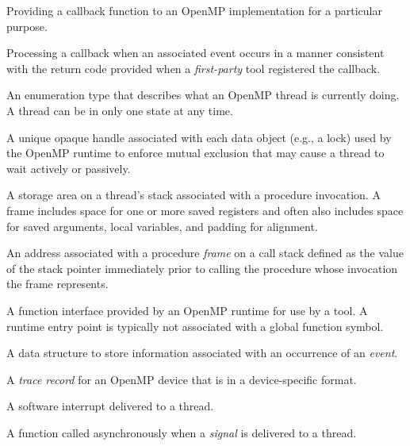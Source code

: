 \glossarydefstart
Providing a callback function to an OpenMP implementation for a particular purpose.
\glossarydefend

\glossarydefstart
Processing a callback when an associated event occurs in a manner consistent with the return code
provided when a \emph{first-party} tool registered the callback.
\glossarydefend

\glossarydefstart
An enumeration type that describes what an OpenMP thread is currently doing.  
A thread can be in only one state at any time.
\glossarydefend

\glossarydefstart
A unique opaque handle associated with each data object (e.g., a lock) used by the OpenMP runtime
to enforce mutual exclusion that may cause a thread to wait actively or passively.
\glossarydefend

\glossarydefstart
A storage area on a thread's stack associated with a procedure invocation. A frame includes space for 
one or more saved registers and often also includes space for saved arguments, local variables, 
and padding for alignment.
\glossarydefend

\glossarydefstart
An address associated with a procedure \emph{frame} on a call stack defined as the value of the stack pointer immediately prior 
to calling the procedure whose invocation the frame represents.
\glossarydefend

\glossarydefstart
A function interface provided by an OpenMP runtime for use by a tool. A runtime entry point is
typically not associated with a global function symbol.
\glossarydefend

\glossarydefstart
A data structure to store information associated with an occurrence of an \emph{event}.
\glossarydefend

\glossarydefstart
A \emph{trace record} for an OpenMP device that is in a device-specific format. 
\glossarydefend

\glossarydefstart
A software interrupt delivered to a thread.
\glossarydefend

\glossarydefstart
A function called asynchronously when a \emph{signal} is delivered to a thread.
\glossarydefend

